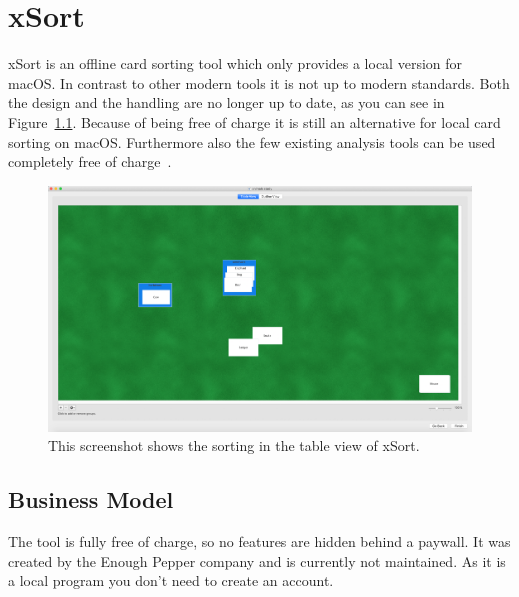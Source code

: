 \chapter{xSort}

\label{chap:tool}

xSort is an offline card sorting tool which only provides a local version for 
macOS. In contrast to other modern tools it is not up to modern standards. 
Both the design and the handling are no longer up to date, as you can 
see in Figure~\ref{fig:xSort-sorting}. Because of being free of charge it is 
still an alternative for local card sorting on macOS. Furthermore also the 
few existing analysis tools can be used completely free of 
charge~\parencite{xSort}.



\begin{figure}[tp] 
\centering
\includegraphics[keepaspectratio,width=\linewidth,height=\halfh]{images/xsort-sorting.png}
\caption[xSort Application] { This screenshot shows the sorting in the table view of xSort.
 }
\label{fig:xSort-sorting}
\end{figure}



\section{Business Model}

The tool is fully free of charge, so no features are hidden behind a 
paywall. It was created by the Enough Pepper company and is 
currently not maintained. As it is a local program you don't need 
to create an account.



